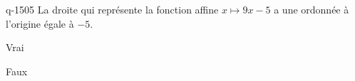 \begin{truefalse}{q-1505}
La droite qui représente la fonction affine $x\mapsto 9x-5$ a une ordonnée à l'origine égale à $-5$.
\item* Vrai
\item Faux
\end{truefalse}

